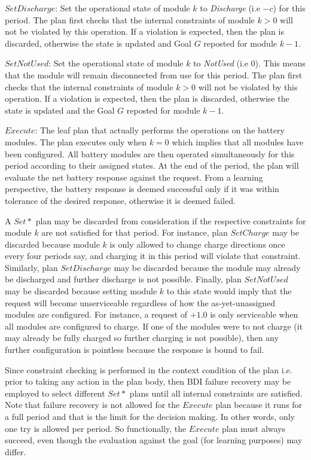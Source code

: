 $SetDischarge$: Set the operational state of module $k$ to {\em Discharge} (i.e $-c$) for this period. The plan first checks that the internal constraints of module $k>0$ will not be violated by this operation. If a violation is expected, then the plan is discarded, otherwise the state is updated and Goal $G$ reposted for module $k-1$.

$SetNotUsed$: Set the operational state of module $k$ to {\em NotUsed} (i.e $0$). This means that the module will remain disconnected from use for this period. The plan first checks that the internal constraints of module $k>0$ will not be violated by this operation. If a violation is expected, then the plan is discarded, otherwise the state is updated and the Goal $G$ reposted for module $k-1$.

$Execute$: The leaf plan that actually performs the operations on the battery modules. The plan executes only when $k=0$ which implies that all modules have been configured. All battery modules are then operated simultaneously for this period according to their assigned states. At the end of the period, the plan will evaluate the net battery response against the request. From a learning perspective, the battery response is deemed successful only if it was within tolerance of the desired response, otherwise it is deemed failed.


A $Set*$ plan may be discarded from consideration if the respective constraints for module $k$ are not satisfied for that period. For instance, plan $SetCharge$ may be discarded because module $k$ is only allowed to change charge directions once every four periods say, and charging it in this period will violate that constraint. Similarly, plan $SetDischarge$ may be discarded because the module may already be discharged and further discharge is not possible. Finally, plan $SetNotUsed$ may be discarded because setting module $k$ to this state would imply that the request will become unserviceable regardless of how the as-yet-unassigned modules are configured. For instance, a request of $+1.0$ is only serviceable when all modules are configured to charge. If one of the modules were to not charge (it may already be fully charged so further charging is not possible), then any further configuration is pointless because the response is bound to fail.

Since constraint checking is performed in the context condition of the plan i.e. prior to taking any action in the plan body, then BDI failure recovery may be employed to select different $Set*$ plans until all internal constraints are satisfied. Note that failure recovery is not allowed for the $Execute$ plan because it runs for a full period and that is the limit for the decision making. In other words, only one try is allowed per period. So functionally, the $Execute$ plan must always succeed, even though the evaluation against the goal (for learning purposes) may differ.


